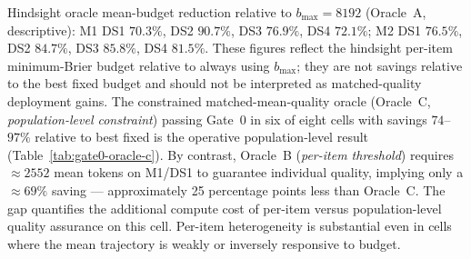 \documentclass[a4paper,fleqn]{cas-sc}
\theoremstyle{plain}
\theoremstyle{definition}
\theoremstyle{remark}
\begin{document}
Hindsight oracle mean-budget reduction relative to $b_{\max}=8192$ (Oracle~A,
descriptive): M1 DS1 $70.3\%$, DS2 $90.7\%$, DS3 $76.9\%$, DS4 $72.1\%$;
M2 DS1 $76.5\%$, DS2 $84.7\%$, DS3 $85.8\%$, DS4 $81.5\%$.
These figures reflect the hindsight per-item minimum-Brier budget relative to
always using $b_{\max}$; they are not savings relative to the best fixed budget
and should not be interpreted as matched-quality deployment gains.
The constrained matched-mean-quality oracle (Oracle~C, \emph{population-level constraint})
passing Gate~0 in six of eight cells with savings $74$--$97\%$ relative to best fixed
is the operative population-level result (Table~\ref{tab:gate0-oracle-c}).
By contrast, Oracle~B (\emph{per-item threshold}) requires ${\approx}2552$ mean tokens on M1/DS1
to guarantee individual quality, implying only a ${\approx}69\%$ saving --- approximately 25
percentage points less than Oracle~C.
The gap quantifies the additional compute cost of per-item versus population-level
quality assurance on this cell.
Per-item heterogeneity is substantial even in cells where the mean trajectory
is weakly or inversely responsive to budget.
\end{document}
